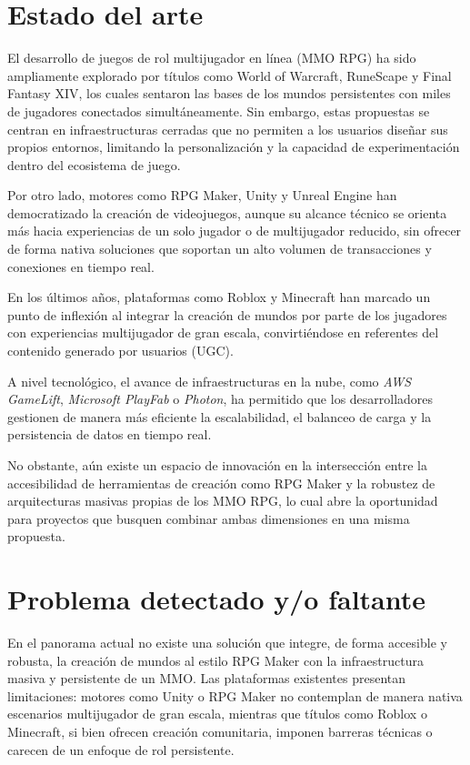\section{Estado del arte}

El desarrollo de juegos de rol multijugador en línea (MMO RPG) ha sido ampliamente explorado por títulos como World of Warcraft,
RuneScape y Final Fantasy XIV, los cuales sentaron las bases de los mundos persistentes con miles de jugadores conectados simultáneamente.
Sin embargo, estas propuestas se centran en infraestructuras cerradas que no permiten a los usuarios diseñar sus propios entornos,
limitando la personalización y la capacidad de experimentación dentro del ecosistema de juego. 
\vspace{0.25cm}

Por otro lado, motores como RPG Maker, Unity y Unreal Engine han democratizado la creación de videojuegos,
aunque su alcance técnico se orienta más hacia experiencias de un solo jugador o de multijugador reducido,
sin ofrecer de forma nativa soluciones que soportan un alto volumen de transacciones y conexiones en tiempo real.
\vspace{0.25cm}

En los últimos años, plataformas como Roblox y Minecraft han marcado un punto de inflexión al integrar la creación de mundos por parte de los jugadores
con experiencias multijugador de gran escala, convirtiéndose en referentes del contenido generado por usuarios (UGC). 
\vspace{0.25cm}

A nivel tecnológico, el avance de infraestructuras en la nube, como \textit{AWS GameLift}, \textit{Microsoft PlayFab} o \textit{Photon}, ha permitido que los desarrolladores 
gestionen de manera más eficiente la escalabilidad, el balanceo de carga y la persistencia de datos en tiempo real.
\vspace{0.25cm}

No obstante, aún existe un espacio de innovación en la intersección entre la accesibilidad de herramientas de creación como RPG Maker 
y la robustez de arquitecturas masivas propias de los MMO RPG, lo cual abre la oportunidad para proyectos que busquen combinar ambas dimensiones en una misma propuesta.

\section{Problema detectado y/o faltante}

En el panorama actual no existe una solución que integre, de forma accesible y robusta, la creación de mundos al estilo RPG Maker con la infraestructura masiva y persistente de un MMO. 
Las plataformas existentes presentan limitaciones: motores como Unity o RPG Maker no contemplan de manera nativa escenarios multijugador de gran escala, 
mientras que títulos como Roblox o Minecraft, si bien ofrecen creación comunitaria, imponen barreras técnicas o carecen de un enfoque de rol persistente.  
\vspace{0.25cm}

